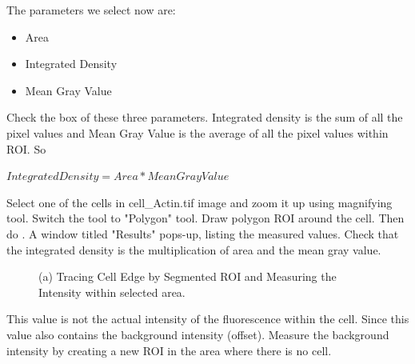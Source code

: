 \begin{indentexercise}{1}
The parameters we select now are:
\begin{itemize}
\item Area
\item Integrated Density 
\item Mean Gray Value
\end{itemize}

Check the box of these three parameters. Integrated density is the sum
of all the pixel values and Mean Gray Value is the average of all the
pixel values within ROI. So 

$Integrated Density = Area * Mean Gray Value$

Select one of the cells in cell\_Actin.tif image and zoom it up
using magnifying tool. Switch the tool to
"Polygon" tool. Draw polygon ROI around
the cell. Then do . A window
titled "Results" pops-up, listing the
measured values. Check that the integrated density is the
multiplication of area and the mean gray value.




\begin{figure}[htbp]
 \centering
 \caption{ (a) Tracing Cell Edge by Segmented ROI and Measuring the Intensity within selected area. }
 \label{fig:CellIntensityMeasurement}
\end{figure} 

This value is not the actual intensity of the fluorescence within the
cell. Since this value also contains the background intensity (offset).
Measure the background intensity by creating a new ROI in the area
where there is no cell.


\end{indentexercise}
